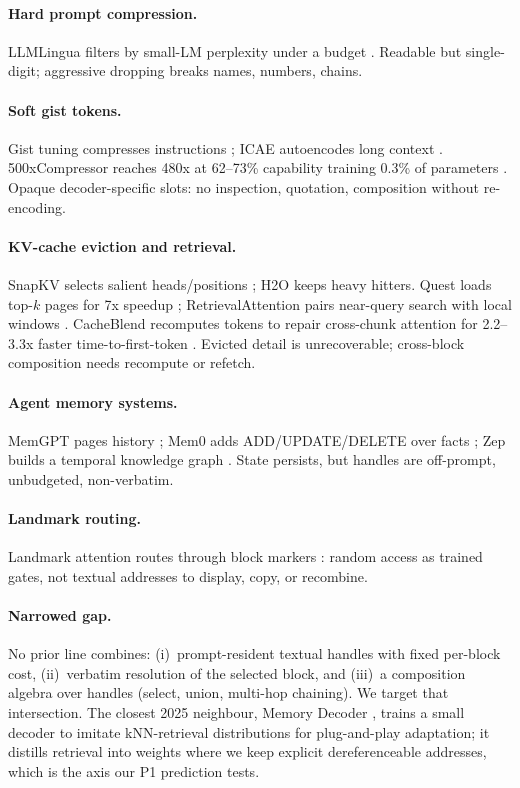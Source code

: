 \label{sec:related}

\paragraph{Hard prompt compression.}
LLMLingua filters by small-LM perplexity under a budget \cite{jiang2023llmlingua}. Readable but single-digit; aggressive dropping breaks names, numbers, chains.

\paragraph{Soft gist tokens.}
Gist tuning compresses instructions \cite{mu2023gist}; ICAE autoencodes long context \cite{ge2024icae}. 500xCompressor reaches 480x at 62--73\% capability training 0.3\% of parameters \cite{li2025500xcompressor}. Opaque decoder-specific slots: no inspection, quotation, composition without re-encoding.

\paragraph{KV-cache eviction and retrieval.}
SnapKV selects salient heads/positions \cite{li2024snapkv}; H2O keeps heavy hitters. Quest loads top-$k$ pages for 7x speedup \cite{tang2024quest}; RetrievalAttention pairs near-query search with local windows \cite{liu2025retrievalattention}. CacheBlend recomputes tokens to repair cross-chunk attention for 2.2--3.3x faster time-to-first-token \cite{yao2025cacheblend}. Evicted detail is unrecoverable; cross-block composition needs recompute or refetch.

\paragraph{Agent memory systems.}
MemGPT pages history \cite{packer2023memgpt}; Mem0 adds ADD/UPDATE/DELETE over facts \cite{chhikara2025mem0}; Zep builds a temporal knowledge graph \cite{rasmussen2025zep}. State persists, but handles are off-prompt, unbudgeted, non-verbatim.

\paragraph{Landmark routing.}
Landmark attention routes through block markers \cite{mohtashami2023landmark}: random access as trained gates, not textual addresses to display, copy, or recombine.

\paragraph{Narrowed gap.}
No prior line combines: (i)~prompt-resident textual handles with fixed per-block cost, (ii)~verbatim resolution of the selected block, and (iii)~a composition algebra over handles (select, union, multi-hop chaining). We target that intersection. The closest 2025 neighbour, Memory Decoder \cite{cao2025memorydecoder}, trains a small decoder to imitate kNN-retrieval distributions for plug-and-play adaptation; it distills retrieval into weights where we keep explicit dereferenceable addresses, which is the axis our P1 prediction tests.
